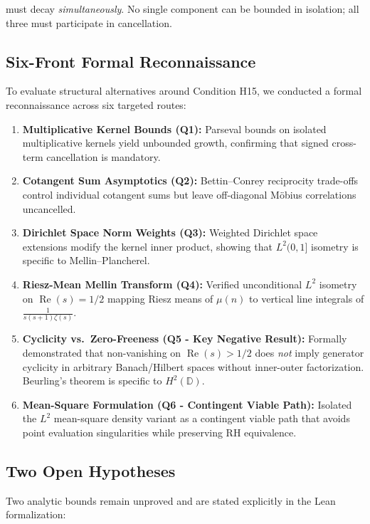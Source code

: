 \documentclass[11pt,a4paper]{article}
\theoremstyle{plain}
\theoremstyle{definition}
\theoremstyle{remark}
\DeclareMathOperator{\RePart}{Re}
\renewcommand{\Re}{\RePart}
\begin{document}
must decay \emph{simultaneously}. No single component can be bounded in isolation; all three must participate in cancellation.

\subsection{Six-Front Formal Reconnaissance}

To evaluate structural alternatives around Condition H15, we conducted a formal reconnaissance across six targeted routes:

\begin{enumerate}[label=\textbf{Front \arabic*.}]
  \item \textbf{Multiplicative Kernel Bounds (Q1):} Parseval bounds on isolated multiplicative kernels yield unbounded growth, confirming that signed cross-term cancellation is mandatory.
  \item \textbf{Cotangent Sum Asymptotics (Q2):} Bettin--Conrey reciprocity trade-offs control individual cotangent sums but leave off-diagonal Möbius correlations uncancelled.
  \item \textbf{Dirichlet Space Norm Weights (Q3):} Weighted Dirichlet space extensions modify the kernel inner product, showing that $L^2(0,1]$ isometry is specific to Mellin--Plancherel.
  \item \textbf{Riesz-Mean Mellin Transform (Q4):} Verified unconditional $L^2$ isometry on $\Re(s)=1/2$ mapping Riesz means of $\mu(n)$ to vertical line integrals of $\frac{1}{s(s+1)\zeta(s)}$.
  \item \textbf{Cyclicity vs.\ Zero-Freeness (Q5 - Key Negative Result):} Formally demonstrated that non-vanishing on $\Re(s) > 1/2$ does \emph{not} imply generator cyclicity in arbitrary Banach/Hilbert spaces without inner-outer factorization. Beurling's theorem is specific to $H^2(\mathbb{D})$.
  \item \textbf{Mean-Square Formulation (Q6 - Contingent Viable Path):} Isolated the $L^2$ mean-square density variant as a contingent viable path that avoids point evaluation singularities while preserving RH equivalence.
\end{enumerate}

\subsection{Two Open Hypotheses}

Two analytic bounds remain unproved and are stated explicitly in the Lean formalization:
\end{document}
